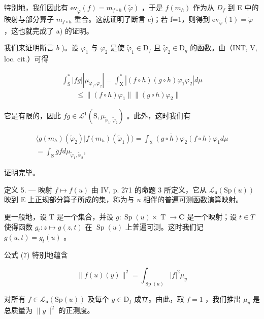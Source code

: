 特别地，我们因此有 \(\mathrm{ev}_{\widetilde{\varphi}}(f)=m_{f\circ h}(\widetilde{\varphi})\) ，于是 \(f(m_{h})\) 作为从 \(D_{f}\) 到 E 中的映射与部分算子 \(m_{f\circ h}\) 重合。这就证明了断言 c)；若 f=1，则得到 \(\mathrm{ev}_{\widetilde{\varphi}}(1)=\widetilde{\varphi}\) ，这也就完成了 a) 的证明。

我们来证明断言 \(b\) )。设 \(\varphi_{1}\) 与 \(\varphi_{2}\) 是使 \(\widetilde{\varphi}_{1} \in \mathrm{D}_{f}\) 且 \(\widetilde{\varphi}_{2} \in \mathrm{D}_{g}\) 的函数。由（INT, V, loc. cit.）可得

\[
\begin{array}{l} \int_ {\mathrm{S}} ^ {*} | f g |   | \mu_ {\widetilde {\varphi_ {1}}, \widetilde {\varphi_ {2}}} | = \int_ {\mathrm{X}} ^ {*} | (f \circ h) (g \circ h) \varphi_ {1} \varphi_ {2} | d \mu \\ \qquad \leqslant \| (f \circ h) \varphi_ {1} \| \| (g \circ h) \varphi_ {2} \| \end{array}
\]

它是有限的，因此 \(fg \in \mathcal{L}^1(\mathrm{S}, \mu_{\widetilde{\varphi}_1, \widetilde{\varphi}_2})\) 。此外，这时我们有

\[
\begin{array}{c} \langle g (m _ {h}) (\widetilde {\varphi} _ {2})   |   f (m _ {h}) (\widetilde {\varphi} _ {1}) \rangle = \int_ {\mathrm{X}} \overline {{(g \circ h)   \varphi_ {2}}}    (f \circ h)   \varphi_ {1}    d \mu \\ = \int_ {\mathrm{S}} \overline {{g}}   f    d \mu_ {\widetilde {\varphi} _ {1}, \widetilde {\varphi} _ {2}}, \end{array}
\]

证明完毕。

定义 5. --- 映射 \(f \mapsto f(u)\) 由 IV, p. 271 的命题 3 所定义，它从 \(\mathcal{L}_{\mathrm{u}}(\mathrm{Sp}(u))\) 映到 E 上正规部分算子所成的集，称为与 \(u\) 相伴的普遍可测函数演算映射。

更一般地，设 T 是一个集合，并设 \(g\colon\operatorname{Sp}(u)\times\operatorname{T}\to\mathbf{C}\) 是一个映射；设 \(t\in T\) 使得函数 \(g_{t}\colon z\mapsto g(z,t)\) 在 \(\operatorname{Sp}(u)\) 上普遍可测。这时我们记 \(g(u,t)=g_{t}(u)\) 。

公式 (7) 特别地蕴含

\[
\| f (u) (y) \| ^ {2} = \int_ {\operatorname{Sp} (u)} | f | ^ {2} \mu_ {y}\tag{8}
\]

对所有 \(f \in \mathcal{L}_{\mathrm{u}}(\mathrm{Sp}(u))\) 及每个 \(y \in \mathrm{D}_f\) 成立。由此，取 \(f = 1\) ，我们推出 \(\mu_y\) 是总质量为 \(\| y\|^2\) 的正测度。

